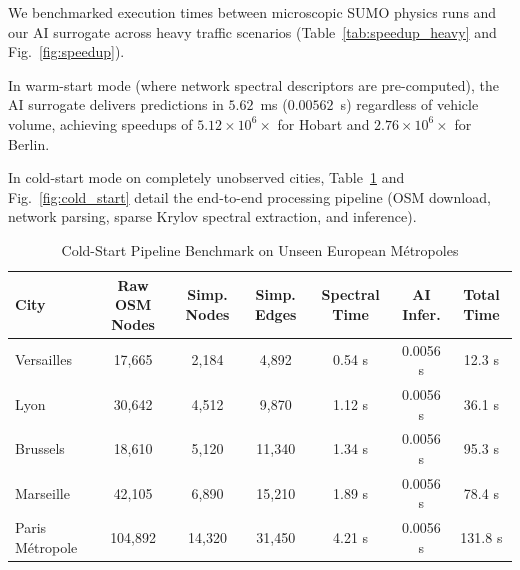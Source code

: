 \documentclass[journal]{IEEEtran}
\begin{document}
We benchmarked execution times between microscopic SUMO physics runs and our AI surrogate across heavy traffic scenarios (Table~\ref{tab:speedup_heavy} and Fig.~\ref{fig:speedup}).

\begin{table}[htbp]
\caption{Execution Time and Speedup Comparison under Heavy Traffic}
\label{tab:speedup_heavy}
\centering
{}
\end{table}

In warm-start mode (where network spectral descriptors are pre-computed), the AI surrogate delivers predictions in $5.62$~ms ($0.00562$~s) regardless of vehicle volume, achieving speedups of $5.12 \times 10^6 \times$ for Hobart and $2.76 \times 10^6 \times$ for Berlin.

In cold-start mode on completely unobserved cities, Table~\ref{tab:cold_start} and Fig.~\ref{fig:cold_start} detail the end-to-end processing pipeline (OSM download, network parsing, sparse Krylov spectral extraction, and inference).

\begin{table}[htbp]
\caption{Cold-Start Pipeline Benchmark on Unseen European Métropoles}
\label{tab:cold_start}
\centering
\begin{tabular}{lcccccc}
\toprule
City & Raw OSM Nodes & Simp. Nodes & Simp. Edges & Spectral Time & AI Infer. & Total Time \\
\midrule
Versailles & 17,665 & 2,184 & 4,892 & 0.54 s & 0.0056 s & 12.3 s \\
Lyon & 30,642 & 4,512 & 9,870 & 1.12 s & 0.0056 s & 36.1 s \\
Brussels & 18,610 & 5,120 & 11,340 & 1.34 s & 0.0056 s & 95.3 s \\
Marseille & 42,105 & 6,890 & 15,210 & 1.89 s & 0.0056 s & 78.4 s \\
Paris Métropole & 104,892 & 14,320 & 31,450 & 4.21 s & 0.0056 s & 131.8 s \\
\bottomrule
\end{tabular}
\end{table}
\end{document}
